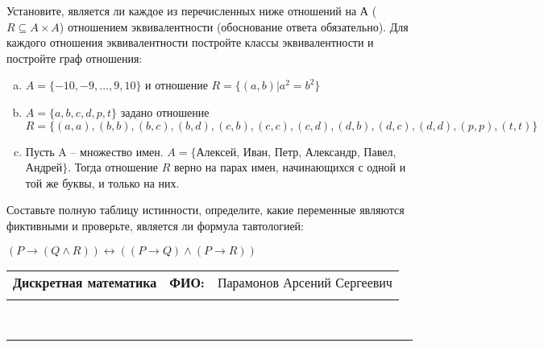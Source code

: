 \documentclass[10pt]{exam}
\newcommand{\class}{Дискретная математика}
\newcommand{\examdate}{}
\begin{document}
\begin{questions}
\question
Установите, является ли каждое из перечисленных ниже отношений на А ($R \subseteq A \times A$) отношением эквивалентности (обоснование ответа обязательно). Для каждого отношения эквивалентности постройте классы 
эквивалентности и постройте граф отношения:
\begin{enumerate} [a)]\setcounter{enumi}{0}
\item $A = \{-10, -9, … , 9, 10\}$ и отношение $R = \{(a,b)|a^{2} = b^{2}\}$
\item $A = \{a, b, c, d, p, t\}$ задано отношение $R = \{(a, a), (b, b), (b, c), (b, d), (c, b), (c, c), (c, d), (d, b), (d, c), (d, d), (p,p), (t,t)\}$
\item Пусть A – множество имен. $A = \{ $Алексей, Иван, Петр, Александр, Павел, Андрей$ \}$. Тогда отношение $R$ верно на парах имен, начинающихся с одной и той же буквы, и только на них.
\end{enumerate}\question Составьте полную таблицу истинности, определите, какие переменные являются фиктивными и проверьте, является ли формула тавтологией:

$(P \rightarrow (Q \land R)) \leftrightarrow ((P \rightarrow Q) \land (P \rightarrow R))$

\end{questions}
\newpage
\begin{flushright}
\begin{tabular}{p{2.8in} r l}
\textbf{\class} & \textbf{ФИО:} &Парамонов Арсений Сергеевич
\\

\textbf{\examdate} &&\\
\end{tabular}\\
\end{flushright}
\rule[1ex]{\textwidth}{.1pt}
\end{document}
